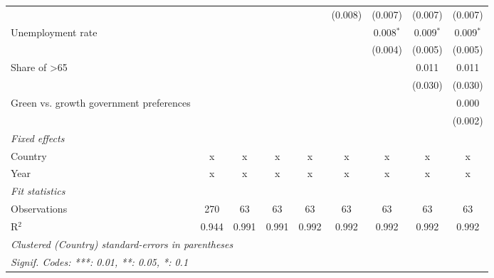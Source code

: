 \begin{table}[htbp]
\begin{tabular}{lcccccccc}
                                                                             &         &         &         &             & (0.008)     & (0.007)     & (0.007)     & (0.007)\\   
      Unemployment rate                                                      &         &         &         &             &             & 0.008$^{*}$ & 0.009$^{*}$ & 0.009$^{*}$\\   
                                                                             &         &         &         &             &             & (0.004)     & (0.005)     & (0.005)\\   
      Share of >65                                                           &         &         &         &             &             &             & 0.011       & 0.011\\   
                                                                             &         &         &         &             &             &             & (0.030)     & (0.030)\\   
      Green vs. growth government preferences                                &         &         &         &             &             &             &             & 0.000\\   
                                                                             &         &         &         &             &             &             &             & (0.002)\\   
      \emph{Fixed effects}\\
      Country                                                                & x       & x       & x       & x           & x           & x           & x           & x\\  
      Year                                                                   & x       & x       & x       & x           & x           & x           & x           & x\\  
      \midrule \emph{Fit statistics}\\
      Observations                                                           & 270     & 63      & 63      & 63          & 63          & 63          & 63          & 63\\  
      R$^2$                                                                  & 0.944   & 0.991   & 0.991   & 0.992       & 0.992       & 0.992       & 0.992       & 0.992\\  
      \midrule
      \multicolumn{9}{l}{\emph{Clustered (Country) standard-errors in parentheses}}\\
      \multicolumn{9}{l}{\emph{Signif. Codes: ***: 0.01, **: 0.05, *: 0.1}}\\
   \end{tabular}
\end{table}


